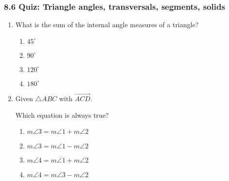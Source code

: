 

\fancyhead[LE]{\thepage}



\subsubsection*{8.6 Quiz: Triangle angles, transversals, segments, solids}
\begin{enumerate}
\item What is the sum of the internal angle measures of a triangle?
\begin{multicols}{2}
\begin{enumerate}
  \item $45^\circ$
  \item $90^\circ$
  \item $120^\circ$
  \item $180^\circ$
\end{enumerate}
\end{multicols}

\item Given $\triangle ABC$ with $\overrightarrow{ACD}$.
\begin{center}
\end{center}
Which equation is always true?
\begin{multicols}{2}
\begin{enumerate}
  \item $m\angle 3 = m\angle 1 + m\angle 2$
  \item $m\angle 3 = m\angle 1 - m\angle 2$ 
  \item $m\angle 4 = m\angle 1 + m\angle 2$
  \item $m\angle 4 = m\angle 3 - m\angle 2$
\end{enumerate}
\end{multicols}


\end{enumerate}
